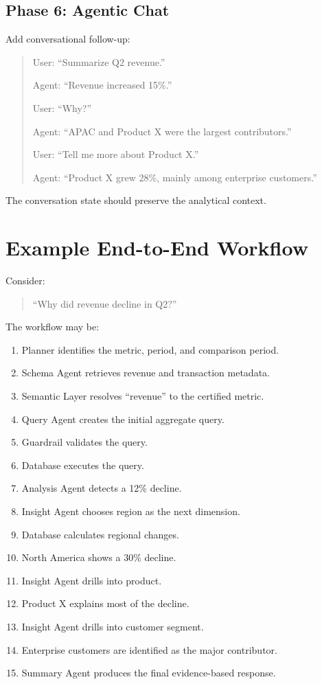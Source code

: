 \documentclass[11pt,a4paper]{article}
\begin{document}
\subsection{Phase 6: Agentic Chat}

Add conversational follow-up:

\begin{quote}
User: ``Summarize Q2 revenue.''

Agent: ``Revenue increased 15\%.''

User: ``Why?''

Agent: ``APAC and Product X were the largest contributors.''

User: ``Tell me more about Product X.''

Agent: ``Product X grew 28\%, mainly among enterprise customers.''
\end{quote}

The conversation state should preserve the analytical context.

\section{Example End-to-End Workflow}

Consider:

\begin{quote}
``Why did revenue decline in Q2?''
\end{quote}

The workflow may be:

\begin{enumerate}
    \item Planner identifies the metric, period, and comparison period.
    \item Schema Agent retrieves revenue and transaction metadata.
    \item Semantic Layer resolves ``revenue'' to the certified metric.
    \item Query Agent creates the initial aggregate query.
    \item Guardrail validates the query.
    \item Database executes the query.
    \item Analysis Agent detects a 12\% decline.
    \item Insight Agent chooses region as the next dimension.
    \item Database calculates regional changes.
    \item North America shows a 30\% decline.
    \item Insight Agent drills into product.
    \item Product X explains most of the decline.
    \item Insight Agent drills into customer segment.
    \item Enterprise customers are identified as the major contributor.
    \item Summary Agent produces the final evidence-based response.
\end{enumerate}
\end{document}
